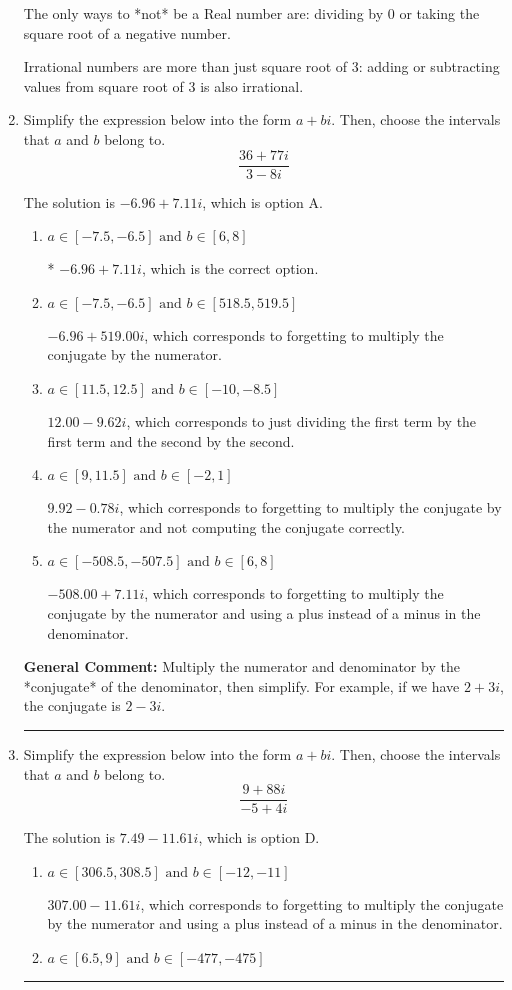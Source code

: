 \documentclass{extbook}[14pt]
\newcommand{\litem}[1]{\item #1

\rule{\textwidth}{0.4pt}}
\begin{document}
\begin{enumerate}
{ The only ways to *not* be a Real number are: dividing by 0 or taking the square root of a negative number. 
 
 Irrational numbers are more than just square root of 3: adding or subtracting values from square root of 3 is also irrational.
}
\litem{
Simplify the expression below into the form $a+bi$. Then, choose the intervals that $a$ and $b$ belong to.
\[ \frac{36 + 77 i}{3 - 8 i} \]

The solution is \( -6.96  + 7.11 i \), which is option A.\begin{enumerate}[label=\Alph*.]
\item \( a \in [-7.5, -6.5] \text{ and } b \in [6, 8] \)

* $-6.96  + 7.11 i$, which is the correct option.
\item \( a \in [-7.5, -6.5] \text{ and } b \in [518.5, 519.5] \)

 $-6.96  + 519.00 i$, which corresponds to forgetting to multiply the conjugate by the numerator.
\item \( a \in [11.5, 12.5] \text{ and } b \in [-10, -8.5] \)

 $12.00  - 9.62 i$, which corresponds to just dividing the first term by the first term and the second by the second.
\item \( a \in [9, 11.5] \text{ and } b \in [-2, 1] \)

 $9.92  - 0.78 i$, which corresponds to forgetting to multiply the conjugate by the numerator and not computing the conjugate correctly.
\item \( a \in [-508.5, -507.5] \text{ and } b \in [6, 8] \)

 $-508.00  + 7.11 i$, which corresponds to forgetting to multiply the conjugate by the numerator and using a plus instead of a minus in the denominator.
\end{enumerate}

\textbf{General Comment:} Multiply the numerator and denominator by the *conjugate* of the denominator, then simplify. For example, if we have $2+3i$, the conjugate is $2-3i$.
}
\litem{
Simplify the expression below into the form $a+bi$. Then, choose the intervals that $a$ and $b$ belong to.
\[ \frac{9 + 88 i}{-5 + 4 i} \]

The solution is \( 7.49  - 11.61 i \), which is option D.\begin{enumerate}[label=\Alph*.]
\item \( a \in [306.5, 308.5] \text{ and } b \in [-12, -11] \)

 $307.00  - 11.61 i$, which corresponds to forgetting to multiply the conjugate by the numerator and using a plus instead of a minus in the denominator.
\item \( a \in [6.5, 9] \text{ and } b \in [-477, -475] \)


\end{enumerate}}
\end{enumerate}
\end{document}

